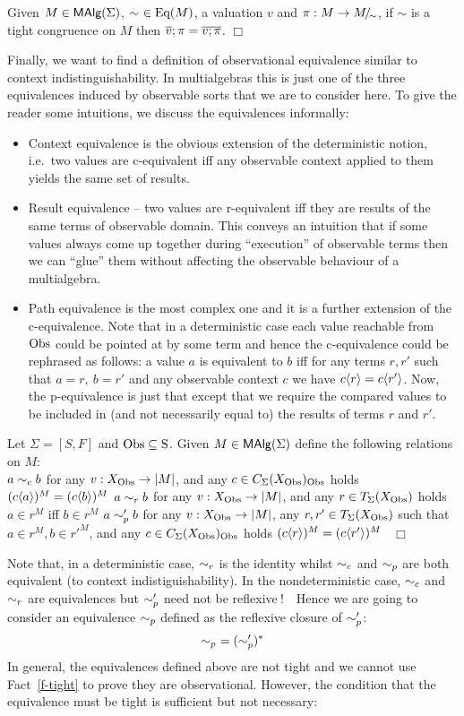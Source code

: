 \begin{Fact}
\label{f-tight}
Given $M \in \mbox{\rm\sf MAlg}(\Sigma)$, $\sim\ \in \mbox{Eq}(M)$, a valuation $v$ and
$\pi: M \rightarrow M\!{\textstyle /}\!_\sim$, if $\sim$ is a tight congruence on $M$ then
$\mbox{$\overline{v}$};\pi = \mbox{$\overline{v;\pi}$}$.
\hfill$\Box$
\end{Fact}

Finally, we want to find a definition of observational equivalence
similar to context indistinguishability. In multialgebras this is just
one of the three equivalences induced by observable sorts that we are
to consider here. To give the reader some intuitions, we discuss the
equivalences informally:
\begin{itemize}
\item Context equivalence is the obvious extension of the
deterministic notion, i.e.\ two values are c-equivalent iff any
observable context applied to them yields the same set of results.
\item Result equivalence -- two values are r-equivalent iff they are
results of the same terms of observable domain. This conveys an
intuition that if some values always come up together during
``execution'' of observable terms then we can ``glue'' them without
affecting the observable behaviour of a multialgebra.
\item Path equivalence is the most complex one and it is a further
extension of the c-equivalence. Note that in a deterministic case each
value reachable from $\rm Obs$ could be pointed at by some term and hence
the c-equivalence could be rephrased as follows: a value $a$ is
equivalent to $b$ iff for any terms $r,r'$ such that $a = r,\ b = r'$
and any observable context $c$ we have $c\langle r\rangle  = c\langle r'\rangle $. Now, the
p-equivalence is just that except that we require the compared values
to be included in (and not necessarily equal to) the results of terms
$r$ and $r'$.
\end{itemize}

\begin{Definition}
Let $\Sigma = [S,F]$ and $\rm Obs \subseteq S$. Given $M \in
\mbox{\rm\sf MAlg}(\Sigma)$ define the following relations on $M$: \\ 
\givedef
{$a \sim_c b$} 
{for any $v: X_{\rm Obs} \rightarrow |M|$, and any $c \in
C_{\Sigma}(X_{\rm Obs})_{\rm Obs}$ holds $(c\langle a \rangle)^M = (c\langle b \rangle)^M$}
\givedef
{$a \sim_r b$} 
{for any $v: X_{\rm Obs} \rightarrow |M|$, and any $r \in T_{\Sigma}(X_{\rm Obs})$
holds $a \in r^M$ iff $b \in r^M$}
\givedef
{$a \sim_p' b$}
{for any $v: X_{\rm Obs} \rightarrow |M|$, any $r,r' \in
T_{\Sigma}(X_{\rm Obs})$ such that $a \in r^M, b \in r'^M$, and any
$c \in C_{\Sigma}(X_{\rm Obs})_{\rm Obs}$ holds $(c\langle r \rangle)^M =
(c\langle r' \rangle)^M$}
\ \hfill$\Box$
\end{Definition}
%
Note that, in a deterministic case, $\sim_r$ is the identity whilst $\sim_c$
and $\sim_p$ are both equivalent (to context indistiguishability).  In
the nondeterministic case, $\sim_c$ and $\sim_r$ are equivalences but $\sim_p'$
need not be reflexive$\:$!\ \ Hence we are going to consider an
equivalence $\sim_p$ defined as the reflexive closure of $\sim_p'$:
\[
\sim_p\ = (\sim_p')^\ast
\]
In general, the equivalences defined above are not tight and we cannot
use Fact~\ref{f-tight} to prove they are observational. However, the
condition that the equivalence must be tight is sufficient but not
necessary:

